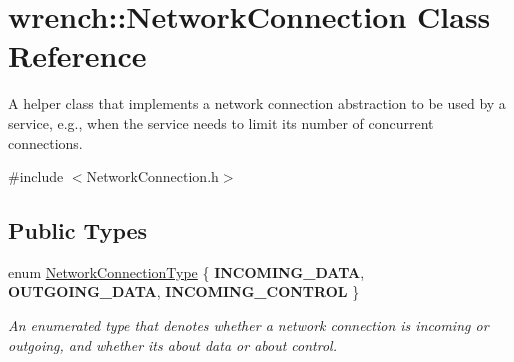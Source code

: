 \hypertarget{classwrench_1_1_network_connection}{}\section{wrench\+:\+:Network\+Connection Class Reference}
\label{classwrench_1_1_network_connection}


A helper class that implements a network connection abstraction to be used by a service, e.\+g., when the service needs to limit its number of concurrent connections.  




{\ttfamily \#include $<$Network\+Connection.\+h$>$}

\subsection*{Public Types}
\begin{DoxyCompactItemize}
\item 
\mbox{\label{classwrench_1_1_network_connection_a6df29e2f2fb7cb5c051eff2867bb08a5}} 
enum \hyperlink{classwrench_1_1_network_connection_a6df29e2f2fb7cb5c051eff2867bb08a5}{Network\+Connection\+Type} \{ {\bfseries I\+N\+C\+O\+M\+I\+N\+G\+\_\+\+D\+A\+TA}, 
{\bfseries O\+U\+T\+G\+O\+I\+N\+G\+\_\+\+D\+A\+TA}, 
{\bfseries I\+N\+C\+O\+M\+I\+N\+G\+\_\+\+C\+O\+N\+T\+R\+OL}
 \}\begin{DoxyCompactList}\small\item\em An enumerated type that denotes whether a network connection is incoming or outgoing, and whether it\textquotesingle{}s about data or about control. \end{DoxyCompactList}
\end{DoxyCompactItemize}
